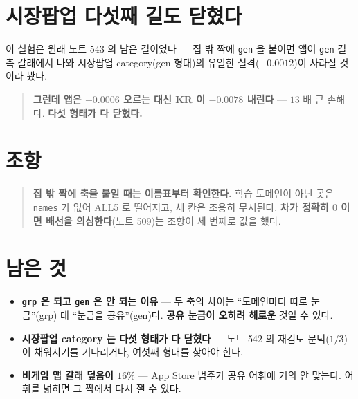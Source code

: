 \documentclass[11pt]{article}
\begin{document}
\section*{시장팝업 다섯째 길도 닫혔다}

이 실험은 원래 노트 $543$ 의 남은 길이었다 --- 집 밖 짝에 \texttt{gen} 을
붙이면 앱이 \texttt{gen} 결측 갈래에서 나와 시장팝업 category(gen 형태)의
유일한 실격($-0.0012$)이 사라질 것이라 봤다.

\begin{quote}
\textbf{그런데 앱은 $+0.0006$ 오르는 대신 KR 이 $-0.0078$ 내린다} ---
$13$ 배 큰 손해다. \textbf{다섯 형태가 다 닫혔다.}
\end{quote}

\section*{조항}

\begin{quote}
\textbf{집 밖 짝에 축을 붙일 때는 이름표부터 확인한다.} 학습 도메인이 아닌
곳은 \texttt{names} 가 없어 ALL5 로 떨어지고, 새 칸은 조용히 무시된다.
\textbf{차가 정확히 $0$ 이면 배선을 의심한다}(노트 509)는 조항이 세 번째로
값을 했다.
\end{quote}

\section*{남은 것}

\begin{itemize}
\item \textbf{\texttt{grp} 은 되고 \texttt{gen} 은 안 되는 이유} --- 두 축의
차이는 ``도메인마다 따로 눈금''(grp) 대 ``눈금을 공유''(gen)다. \textbf{공유
눈금이 오히려 해로운} 것일 수 있다.
\item \textbf{시장팝업 category 는 다섯 형태가 다 닫혔다} --- 노트 542 의
재검토 문턱($1/3$)이 채워지기를 기다리거나, 여섯째 형태를 찾아야 한다.
\item \textbf{비게임 앱 갈래 덮음이 $16\%$} --- App Store 범주가 공유 어휘에
거의 안 맞는다. 어휘를 넓히면 그 짝에서 다시 잴 수 있다.
\end{itemize}
\end{document}
